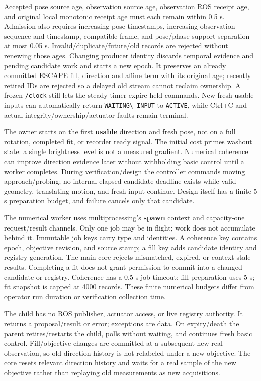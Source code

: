 \documentclass[
  10pt,
  letterpaper,
]{article}
\newcommand{\passthrough}[1]{#1}
\begin{document}
Accepted pose source age, observation source age, observation ROS
receipt age, and original local monotonic receipt age must each remain
within 0.5 s. Admission also requires increasing pose timestamps,
increasing observation sequence and timestamp, compatible frame, and
pose/phase support separation at most 0.05 s.
Invalid/duplicate/future/old records are rejected without renewing those
ages. Changing producer identity discards temporal evidence and pending
candidate work and starts a new epoch. It preserves an already committed
ESCAPE fill, direction and affine term with its original age; recently
retired IDs are rejected so a delayed old stream cannot reclaim
ownership. A frozen \passthrough{\lstinline!/clock!} still lets the
steady timer expire held commands. New fresh usable inputs can
automatically return \passthrough{\lstinline!WAITING\_INPUT!} to
\passthrough{\lstinline!ACTIVE!}, while Ctrl+C and actual
integrity/ownership/actuator faults remain terminal.

The owner starts on the first \textbf{usable} direction and fresh pose,
not on a full rotation, completed fit, or recorder ready signal. The
initial cost primes washout state: a single brightness level is not a
measured gradient. Numerical coherence can improve direction evidence
later without withholding basic control until a worker completes. During
verification/design the controller commands moving approach/probing; no
internal elapsed candidate deadline exists while valid geometry,
translating motion, and fresh input continue. Design itself has a finite
5 s preparation budget, and failure cancels only that candidate.

The numerical worker uses multiprocessing's \textbf{spawn} context and
capacity-one request/result channels. Only one job may be in flight;
work does not accumulate behind it. Immutable job keys carry type and
identities. A coherence key contains epoch, objective revision, and
source stamp; a fill key adds candidate identity and registry
generation. The main core rejects mismatched, expired, or context-stale
results. Completing a fit does not grant permission to commit into a
changed candidate or registry. Coherence has a 0.5 s job timeout; fill
preparation uses 5 s; fit snapshot is capped at 4000 records. These
finite numerical budgets differ from operator run duration or
verification collection time.

The child has no ROS publisher, actuator access, or live registry
authority. It returns a proposal/result or error; exceptions are data.
On expiry/death the parent retires/restarts the child, polls without
waiting, and continues fresh basic control. Fill/objective changes are
committed at a subsequent new real observation, so old direction history
is not relabeled under a new objective. The core resets relevant
direction history and waits for a real sample of the new objective
rather than replaying old measurements as new acquisitions.
\end{document}
